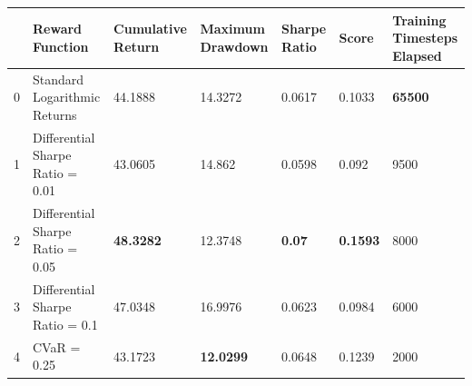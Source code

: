 \begin{tabular}{lllllll}
\toprule
 & Reward Function & Cumulative Return & Maximum Drawdown & Sharpe Ratio & Score & Training Timesteps Elapsed \\
\midrule
0 & Standard Logarithmic Returns & 44.1888 & 14.3272 & 0.0617 & 0.1033 & \textbf{65500} \\
1 & Differential Sharpe Ratio = 0.01 & 43.0605 & 14.862 & 0.0598 & 0.092 & 9500 \\
2 & Differential Sharpe Ratio = 0.05 & \textbf{48.3282} & 12.3748 & \textbf{0.07} & \textbf{0.1593} & 8000 \\
3 & Differential Sharpe Ratio = 0.1 & 47.0348 & 16.9976 & 0.0623 & 0.0984 & 6000 \\
4 & CVaR = 0.25 & 43.1723 & \textbf{12.0299} & 0.0648 & 0.1239 & 2000 \\
\bottomrule
\end{tabular}
